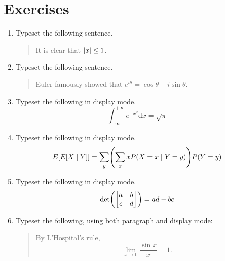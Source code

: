 \documentclass{article}
\begin{document}
\section{Exercises}
\begin{enumerate}
\item
  Typeset the following sentence.
  \begin{quote}
    It is clear that $\lvert x\rvert \leq 1$.
  \end{quote}

\item
  Typeset the following sentence.
  \begin{quote}
    Euler famously showed that $e^{i \theta} = \cos \theta + i \sin \theta$.
  \end{quote}

\item
  Typeset the following in display mode.
  \begin{equation*}
    \int_{-\infty}^{+\infty} e^{-x^{2}} \mathrm{d}x = \sqrt{\pi}
  \end{equation*}

\item
  Typeset the following in display mode.
  \begin{equation*}
    E \sbrac{E \sbrac{X \mid Y}} =
    \sum_{y} \pbrac*{ \sum_{x} x P \pbrac*{ X = x \mid Y = y } } P \pbrac*{ Y = y }
  \end{equation*}

\item
  Typeset the following in display mode.
  \begin{equation*}
    \det \pbrac*{
      \begin{bmatrix}
        a & b \\
        c & d
      \end{bmatrix}
    }
    = ad - bc
  \end{equation*}

\item
  Typeset the following, using both paragraph and display mode:
  \begin{quote}
    By L'Hospital's rule,
    \begin{equation*}
      \lim_{x \to 0} \frac{\sin x}{x} = 1.
    \end{equation*}
  \end{quote}
\end{enumerate}
\end{document}
